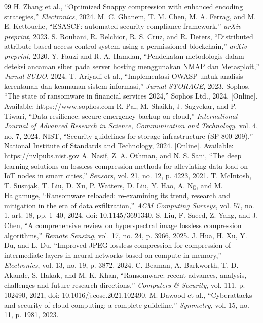 \documentclass{iaesarticle}
\begin{document}
\begin{thebibliography}{99}
 H. Zhang et al., ``Optimized Snappy compression with enhanced encoding strategies,'' \textsl{Electronics}, 2024.
 M. C. Ghanem, T. M. Chen, M. A. Ferrag, and M. E. Kettouche, ``ESASCF: automated security compliance framework,'' \textsl{arXiv preprint}, 2023.
 S. Rouhani, R. Belchior, R. S. Cruz, and R. Deters, ``Distributed attribute-based access control system using a permissioned blockchain,'' \textsl{arXiv preprint}, 2020.
 Y. Fauzi and R. A. Hamdan, ``Pendekatan metodologis dalam deteksi ancaman siber pada server hosting menggunakan NMAP dan Metasploit,'' \textsl{Jurnal SUDO}, 2024.
 T. Ariyadi et al., ``Implementasi OWASP untuk analisis kerentanan dan keamanan sistem informasi,'' \textsl{Jurnal STORAGE}, 2023.
 Sophos, ``The state of ransomware in financial services 2024,'' Sophos Ltd., 2024. [Online]. Available: https://www.sophos.com
 R. Pal, M. Shaikh, J. Sagvekar, and P. Tiwari, ``Data resilience: secure emergency backup on cloud,'' \textsl{International Journal of Advanced Research in Science, Communication and Technology}, vol. 4, no. 7, 2024.
 NIST, ``Security guidelines for storage infrastructure (SP 800-209),'' National Institute of Standards and Technology, 2024. [Online]. Available: https://nvlpubs.nist.gov
 A. Nasif, Z. A. Othman, and N. S. Sani, ``The deep learning solutions on lossless compression methods for alleviating data load on IoT nodes in smart cities,'' \textsl{Sensors}, vol. 21, no. 12, p. 4223, 2021.
 T. McIntosh, T. Susnjak, T. Liu, D. Xu, P. Watters, D. Liu, Y. Hao, A. Ng, and M. Halgamuge, ``Ransomware reloaded: re-examining its trend, research and mitigation in the era of data exfiltration,'' \textsl{ACM Computing Surveys}, vol. 57, no. 1, art. 18, pp. 1--40, 2024, doi: 10.1145/3691340.
 S. Liu, F. Saeed, Z. Yang, and J. Chen, ``A comprehensive review on hyperspectral image lossless compression algorithms,'' \textsl{Remote Sensing}, vol. 17, no. 24, p. 3966, 2025.
 J. Hua, H. Xu, Y. Du, and L. Du, ``Improved JPEG lossless compression for compression of intermediate layers in neural networks based on compute-in-memory,'' \textsl{Electronics}, vol. 13, no. 19, p. 3872, 2024.
 C. Beaman, A. Barkworth, T. D. Akande, S. Hakak, and M. K. Khan, ``Ransomware: recent advances, analysis, challenges and future research directions,'' \textsl{Computers \& Security}, vol. 111, p. 102490, 2021, doi: 10.1016/j.cose.2021.102490.
 M. Dawood et al., ``Cyberattacks and security of cloud computing: a complete guideline,'' \textsl{Symmetry}, vol. 15, no. 11, p. 1981, 2023.

\end{thebibliography}
\end{document}
